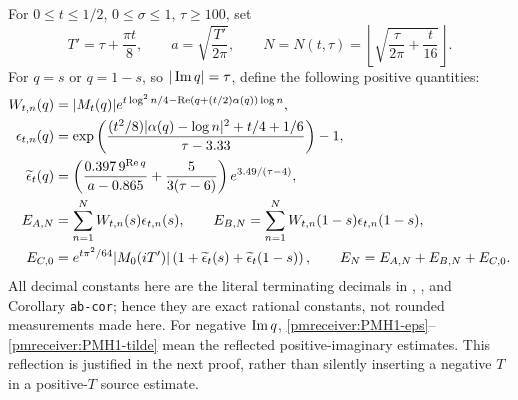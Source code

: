 \documentclass[11pt]{article}
\begin{document}
For $0\le t\le1/2$, $0\le\sigma\le1$, $\tau\ge100$, set
\begin{equation}\label{pmreceiver:PMH1-cutoff}
 T'=\tau+\frac{\pi t}{8},\qquad
 a=\sqrt{\frac{T'}{2\pi}},\qquad
 N=N(t,\tau)=\left\lfloor\sqrt{\frac{\tau}{2\pi}+\frac t{16}}\right\rfloor.
\end{equation}
For $q=s$ or $q=1-s$, so $|\operatorname{Im} q|=\tau$, define the following
positive quantities:
\begin{align}
 W_{t,n}(q)&=|M_t(q)|
 e^{t\log^2n/4-\operatorname{Re}(q+(t/2)\alpha(q))\log n},
 \label{pmreceiver:PMH1-W}\\
 \epsilon_{t,n}(q)&=
 \exp\left(\frac{(t^2/8)|\alpha(q)-\log n|^2+t/4+1/6}
 {\tau-3.33}\right)-1,
 \label{pmreceiver:PMH1-eps}\\
 \widetilde\epsilon_t(q)&=
 \left(\frac{0.397\,9^{\operatorname{Re} q}}{a-0.865}
       +\frac5{3(\tau-6)}\right)e^{3.49/(\tau-4)},
 \label{pmreceiver:PMH1-tilde}\\
 E_{A,N}&=\sum_{n=1}^N W_{t,n}(s)\epsilon_{t,n}(s),
 \qquad E_{B,N}=\sum_{n=1}^N W_{t,n}(1-s)\epsilon_{t,n}(1-s),
 \label{pmreceiver:PMH1-EAB}\\
 E_{C,0}&=e^{t\pi^2/64}|M_0(iT')|
       \left(1+\widetilde\epsilon_t(s)+\widetilde\epsilon_t(1-s)\right),
 \qquad E_N=E_{A,N}+E_{B,N}+E_{C,0}.
 \label{pmreceiver:PMH1-EC}
\end{align}
All decimal constants here are the literal terminating decimals in
, , and Corollary \texttt{ab-cor}; hence they
are exact rational constants, not rounded measurements made here.
For negative $\operatorname{Im} q$, \eqref{pmreceiver:PMH1-eps}--\eqref{pmreceiver:PMH1-tilde} mean the
reflected positive-imaginary estimates. This reflection is justified
in the next proof, rather than silently inserting a negative $T$ in a
positive-$T$ source estimate.
\end{document}
